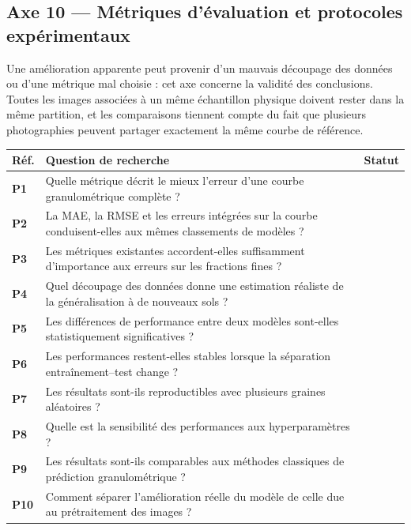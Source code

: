 \documentclass[11pt,a4paper]{article}
\makeatletter
\newenvironment{qtable}{%
  \par\smallskip
  \begin{longtable}{@{}>{\bfseries}p{1.0cm} p{12.3cm} p{1.5cm}@{}}
  \toprule
  \textbf{Réf.} & \textbf{Question de recherche} & \textbf{Statut}\\
  \midrule
  \endhead
}{%
  \bottomrule
  \end{longtable}
}
\makeatother
\begin{document}
\subsection*{Axe 10 --- Métriques d'évaluation et protocoles expérimentaux}
Une amélioration apparente peut provenir d'un mauvais découpage des données ou d'une métrique mal choisie : cet axe concerne la validité des conclusions. Toutes les images associées à un même échantillon physique doivent rester dans la même partition, et les comparaisons tiennent compte du fait que plusieurs photographies peuvent partager exactement la même courbe de référence.
\begin{qtable}
P1 & Quelle métrique décrit le mieux l'erreur d'une courbe granulométrique complète ? & \\
P2 & La MAE, la RMSE et les erreurs intégrées sur la courbe conduisent-elles aux mêmes classements de modèles ? & \\
P3 & Les métriques existantes accordent-elles suffisamment d'importance aux erreurs sur les fractions fines ? & \\
P4 & Quel découpage des données donne une estimation réaliste de la généralisation à de nouveaux sols ? & \\
P5 & Les différences de performance entre deux modèles sont-elles statistiquement significatives ? & \\
P6 & Les performances restent-elles stables lorsque la séparation entraînement--test change ? & \\
P7 & Les résultats sont-ils reproductibles avec plusieurs graines aléatoires ? & \\
P8 & Quelle est la sensibilité des performances aux hyperparamètres ? & \\
P9 & Les résultats sont-ils comparables aux méthodes classiques de prédiction granulométrique ? & \\
P10 & Comment séparer l'amélioration réelle du modèle de celle due au prétraitement des images ? & \\
\end{qtable}
\end{document}
